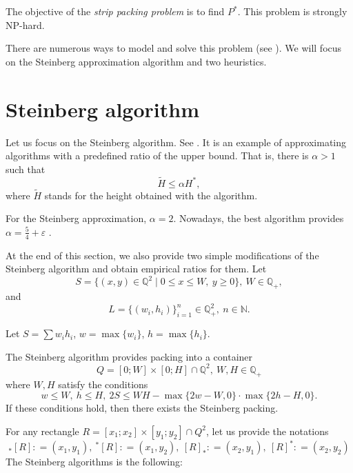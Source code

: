 \documentclass{article}
\theoremstyle{definition}
\theoremstyle{theorem}
\numberwithin{proposition}{section}
\begin{document}
    The objective of the \textit{strip packing problem} is to find $P^{*}$. This problem is strongly NP-hard. 

    There are numerous ways to model and solve this problem (see \cite{lodimartellomonaci}). We will focus on the Steinberg approximation algorithm and two heuristics.
\section*{Steinberg algorithm}
    Let us focus on the Steinberg algorithm. See \cite{steinberg}. It is an example of approximating algorithms with a predefined ratio of the upper bound. That is, there is $\alpha>1$ such that
    \begin{equation*}
        \tilde{H}\leq \alpha H^{*},
    \end{equation*}
    where $\tilde{H}$ stands for the height obtained with the algorithm.


    For the Steinberg approximation, $\alpha=2$. Nowadays, the best algorithm provides $\alpha = \frac{5}{4} + \varepsilon$ \cite{jansenrau}.

    At the end of this section, we also provide two simple modifications of the Steinberg algorithm and obtain empirical ratios for them. Let
    \begin{equation*}
        S=\{(x,y)\in\mathbb{Q}^2\mid 0\leq x\leq W,~y\geq 0\},~W\in\mathbb{Q}_{+},
    \end{equation*}
    and
    \begin{equation*}
        L=\{(w_i,h_i)\}_{i=1}^{n}\in \mathbb{Q}^2_{+},~n\in\mathbb{N}.
    \end{equation*}
 
    Let $S = \sum w_ih_i$, $w = \max\{w_i\}$, $h = \max\{h_i\}$.

    The Steinberg algorithm provides packing into a container 
    \begin{equation*}
        Q=[0;W]\times[0;H]\cap \mathbb{Q}^2,~W,H\in\mathbb{Q}_{+}
    \end{equation*}
    where $W, H$ satisfy the conditions
    \begin{equation*}
        w\leq W,~h\leq H,~2S\leq WH-\max\{2w-W,0\}\cdot \max\{2h-H,0\}.
    \end{equation*}
    If these conditions hold, then there exists the Steinberg packing.

    For any rectangle $R = [x_1; x_2]\times [y_1; y_2]\cap Q^2$, let us provide the notations
    \begin{equation*}
        {}_{*}[R]: = (x_1, y_1),~{}^{*}[R]: = (x_1, y_2),~[R]_{*}: = (x_2, y_1),~[R]^{*}: = (x_2, y_2) 
    \end{equation*}
    The Steinberg algorithms is the following:
\end{document}

